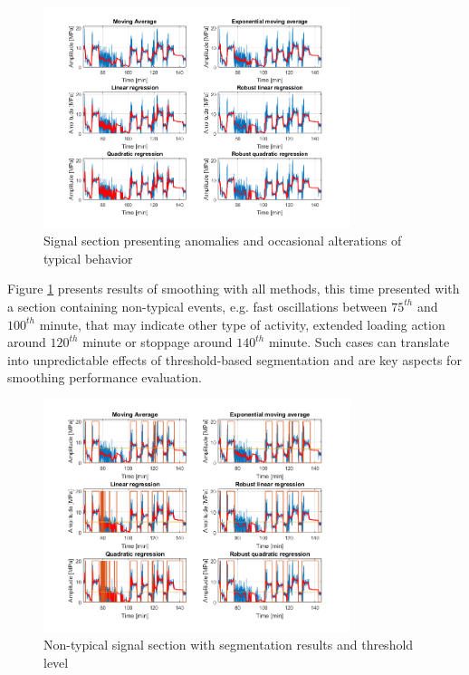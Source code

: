 \documentclass{webofc}
\begin{document}
\begin{figure}[ht!]
\centering
\includegraphics[width=0.8\textwidth,clip]{brzydkie}
\vspace*{-0.8cm}
\caption{Signal section presenting anomalies and occasional alterations of typical behavior}
\label{brzydkie}       %
\vspace*{-0.8cm}
\end{figure}

Figure \ref{brzydkie} presents results of smoothing with all methods, this time presented with a section containing non-typical events, e.g. fast oscillations between $75^{th}$ and $100^{th}$ minute, that may indicate other type of activity, extended loading action around $120^{th}$ minute or stoppage around $140^{th}$ minute. Such cases can translate into unpredictable effects of threshold-based segmentation and are key aspects for smoothing performance evaluation.

\begin{figure}[ht!]
\centering
\includegraphics[width=0.8\textwidth,clip]{bseg}
\vspace*{-0.8cm}
\caption{Non-typical signal section with segmentation results and threshold level}
\label{bseg}       %
\vspace*{-0.8cm}
\end{figure}
\end{document}
